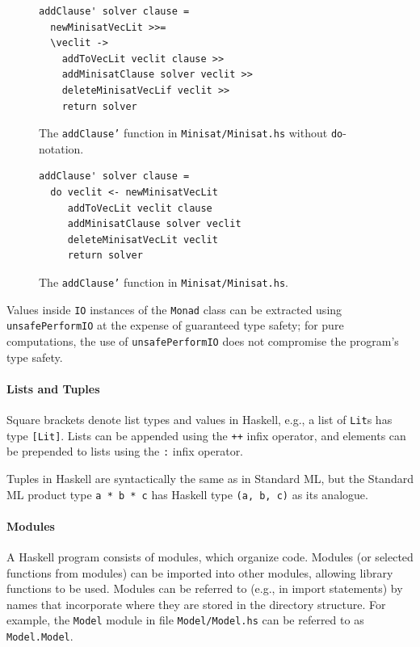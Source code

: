 \documentclass[12pt,a4paper,twoside,openright]{report}
\begin{document}
{\begin{figure}[t]
\centering
\begin{lstlisting}
addClause' solver clause =
  newMinisatVecLit >>=
  \veclit ->
    addToVecLit veclit clause >> 
    addMinisatClause solver veclit >>
    deleteMinisatVecLif veclit >>
    return solver
\end{lstlisting}
\caption{The {\tt addClause'} function in {\tt Minisat/Minisat.hs} without
{\tt do}-notation.}
\label{monad}
\end{figure}
\begin{figure}[t]
\centering
\begin{lstlisting}
addClause' solver clause =
  do veclit <- newMinisatVecLit
     addToVecLit veclit clause
     addMinisatClause solver veclit
     deleteMinisatVecLit veclit
     return solver
\end{lstlisting}
\caption{The {\tt addClause'} function in {\tt Minisat/Minisat.hs}.}
\label{do}
\end{figure}

Values inside \verb,IO, instances of the \verb,Monad, class can be extracted
using \verb,unsafePerformIO, at the expense of guaranteed type safety; for pure
computations, the use of \verb,unsafePerformIO, does not compromise the
program's type safety.
}

\paragraph{Lists and Tuples}{
Square brackets denote list types and values in Haskell, e.g.,
a list of \verb,Lit,s has type \verb,[Lit],.
Lists can be appended using the \verb,++, infix operator, and elements
can be prepended to lists using the \verb,:, infix operator.

Tuples in Haskell are syntactically the same as in Standard ML, but the
Standard ML product type \verb,a * b * c, has Haskell type \verb.(a, b, c).
as its analogue.
}

\paragraph{Modules}{
A Haskell program consists of modules, which organize code.
Modules (or selected functions from modules) can be imported into other
modules, allowing library functions to be used. Modules can be referred
to (e.g., in import statements) by names that incorporate where they are
stored in the directory structure. For example, the \verb,Model, module in file
\verb,Model/Model.hs, can be referred to as \verb,Model.Model,.
}
\end{document}
